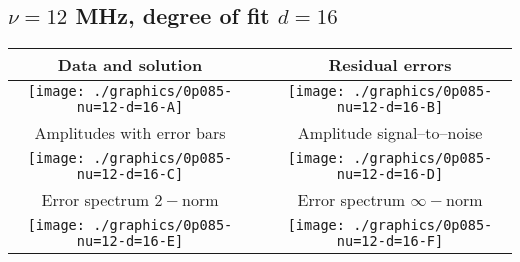 

% 

\clearpage{}
\break{}

\subsection{$\nu = 12$ MHz, degree of fit $d = 16$}

\begin{table}[h]
    \begin{center}
        \begin{tabular}{ccc}
            Data and solution & \quad & Residual errors \\\hline
            \texttt{[image: ./graphics/0p085-nu=12-d=16-A]} &&
            \texttt{[image: ./graphics/0p085-nu=12-d=16-B]} \\[15pt]
            Amplitudes with error bars && Amplitude signal--to--noise \\\hline
            \texttt{[image: ./graphics/0p085-nu=12-d=16-C]} &&
            \texttt{[image: ./graphics/0p085-nu=12-d=16-D]} \\[15pt]
            Error spectrum $2-$norm && Error spectrum $\infty-$norm \\\hline
            \texttt{[image: ./graphics/0p085-nu=12-d=16-E]} &&
            \texttt{[image: ./graphics/0p085-nu=12-d=16-F]} \\[15pt]
        \end{tabular}
    \end{center}
\label{fig:elev=85, nu=12}
\end{table}



\endinput
